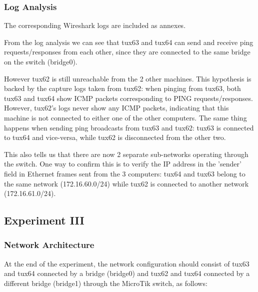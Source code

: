 \documentclass[11pt,a4paper,twocolumn]{article}
\begin{document}
\subsubsection{Log Analysis}

The corresponding Wireshark logs are included as annexes.

From the log analysis we can see that tux63 and tux64 can send and receive ping requests/responses from each other, since they are connected to the same bridge on the switch (bridge0).

However tux62 is still unreachable from the 2 other machines.
This hypothesis is backed by the capture logs taken from tux62: when pinging from tux63, both tux63 and tux64 show ICMP packets corresponding to PING requests/responses. However, tux62's logs never show any ICMP packets, indicating that this machine is not connected to either one of the other computers.
The same thing happens when sending ping broadcasts from tux63 and tux62: tux63 is connected to tux64 and vice-versa, while tux62 is disconnected from the other two.

This also tells us that there are now 2 separate sub-networks operating through the switch. One way to confirm this is to verify the IP address in the 'sender' field in Ethernet frames sent from the 3 computers: tux64 and tux63 belong to the same network (172.16.60.0/24) while tux62 is connected to another network (172.16.61.0/24).

\subsection{Experiment III}

\subsubsection{Network Architecture}

At the end of the experiment, the network configuration should consist of tux63 and tux64 connected by a bridge (bridge0) and tux62 and tux64 connected by a different bridge (bridge1) through the MicroTik switch, as follows:
\end{document}
